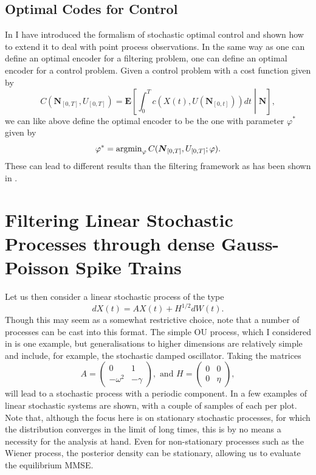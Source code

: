 \subsection{Optimal Codes for Control}

In  I have introduced the formalism of stochastic optimal control and shown how to extend it to deal with point process observations. In the same way
as one can define an optimal encoder for a filtering problem, one can define an optimal encoder for a control problem. Given a control problem with a cost function given
by
\[
C(\boldsymbol{N}_{[0,T]},U_{[0,T]}) =\boldsymbol{E}\left[ \int_0^T c(X(t),U(\boldsymbol{N}_{[0,t]})) dt\middle| \boldsymbol{N}\right],
\]
we can like above define the optimal encoder to be the one with parameter $\varphi^*$ given by
\[
\varphi^* = \operatorname{argmin}_\varphi C(\boldsymbol{N}_{[0,T]},U_{[0,T]};\varphi).
\]
These can lead to different results than the filtering framework as has been shown in \cite{Susemihl2014}.

\section{Filtering Linear Stochastic Processes through dense Gauss-Poisson Spike Trains}

Let us then consider a linear stochastic process of the type
\[
dX(t) = AX(t) + H^{1/2} dW(t).
\]
Though this may seem as a somewhat restrictive choice, note that a number of processes can be cast into this format. The simple OU process, which I considered in
 is one example, but generalisations to higher dimensions are relatively simple and include, for example, the stochastic damped oscillator. Taking
the matrices
\[
A= \left(\begin{array}{cc} 0 & 1\\ -\omega^2&-\gamma\end{array}\right), \textrm{ and }H= \left(\begin{array}{cc} 0 & 0\\ 0& \eta \end{array}\right),
\]
will lead to a stochastic process with a periodic component. In  a few examples of linear stochastic systems are shown, with a couple of 
samples of each per plot. Note that, although the focus here is on stationary stochastic processes, for which the distribution converges in the limit of long times,
this is by no means a necessity for the analysis at hand. Even for non-stationary processes such as the Wiener process, the posterior density can be stationary, allowing us to evaluate the equilibrium MMSE.\par

